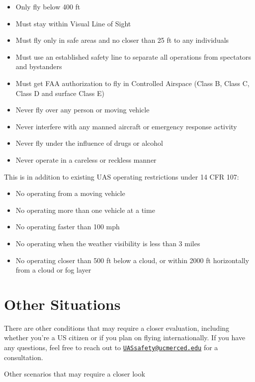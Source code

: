 \documentclass[
]{book}
\providecommand{\tightlist}{%
  \setlength{\itemsep}{0pt}\setlength{\parskip}{0pt}}
\begin{document}
\begin{itemize}
\tightlist
\item
  Only fly below 400 ft
\item
  Must stay within Visual Line of Sight
\item
  Must fly only in safe areas and no closer than 25 ft to any individuals
\item
  Must use an established safety line to separate all operations from spectators and bystanders
\item
  Must get FAA authorization to fly in Controlled Airspace (Class B, Class C, Class D and surface Class E)
\item
  Never fly over any person or moving vehicle
\item
  Never interfere with any manned aircraft or emergency response activity
\item
  Never fly under the influence of drugs or alcohol
\item
  Never operate in a careless or reckless manner
\end{itemize}

This is in addition to existing UAS operating restrictions under 14 CFR 107:

\begin{itemize}
\tightlist
\item
  No operating from a moving vehicle
\item
  No operating more than one vehicle at a time
\item
  No operating faster than 100 mph
\item
  No operating when the weather visibility is less than 3 miles
\item
  No operating closer than 500 ft below a cloud, or within 2000 ft horizontally from a cloud or fog layer
\end{itemize}

\hypertarget{other-situations}{%
\section{Other Situations}\label{other-situations}}

There are other conditions that may require a closer evaluation, including whether you're a US citizen or if you plan on flying internationally. If you have any questions, feel free to reach out to \href{mailto:UASsafety@ucmerced.edu}{\nolinkurl{UASsafety@ucmerced.edu}} for a consultation.

Other scenarios that may require a closer look
\end{document}
